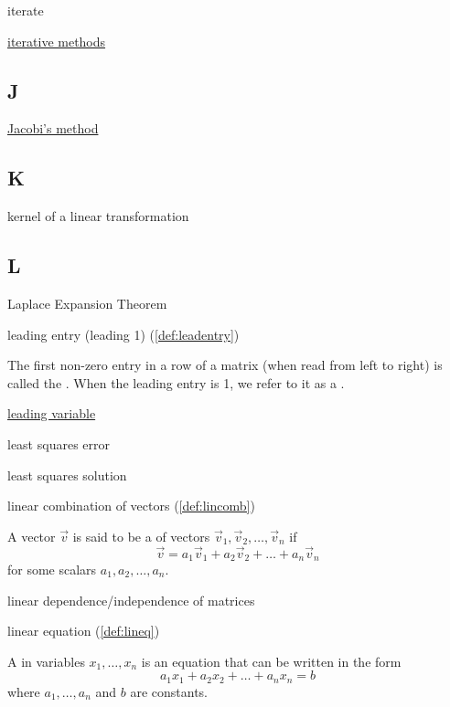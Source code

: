 \documentclass{ximera}
\begin{document}
iterate

\href{https://ximera.osu.edu/oerlinalg/LinearAlgebra/SYS-0040/main}{iterative methods}

\subsection{J}

\href{https://ximera.osu.edu/oerlinalg/LinearAlgebra/SYS-0040/main}{Jacobi's method}


\subsection{K}

kernel of a linear transformation

\subsection{L}

Laplace Expansion Theorem

leading entry (leading 1) (\ref{def:leadentry})
\begin{expandable}
    The first non-zero entry in a row of a matrix (when read from left to right) is called the .  When the leading entry is 1, we refer to it as a .
\end{expandable}

\href{https://ximera.osu.edu/oerlinalg/LinearAlgebra/SYS-0020/main}{leading variable}

least squares error %

least squares solution %

linear combination of vectors (\ref{def:lincomb})
\begin{expandable}
    A vector $\vec{v}$ is said to be a  of vectors $\vec{v}_1, \vec{v}_2,\ldots, \vec{v}_n$ if 
$$\vec{v}=a_1\vec{v}_1+ a_2\vec{v}_2+\ldots + a_n\vec{v}_n$$
for some scalars $a_1, a_2, \ldots ,a_n$.
\end{expandable}

linear dependence/independence of matrices

linear equation (\ref{def:lineq})
\begin{expandable}
    A  in variables $x_1, \ldots, x_n$ is an equation that can be written in the form
$$a_1x_1+a_2x_2+\ldots +a_nx_n=b$$
where $a_1,\ldots ,a_n$ and $b$ are constants.
\end{expandable}
\end{document}
